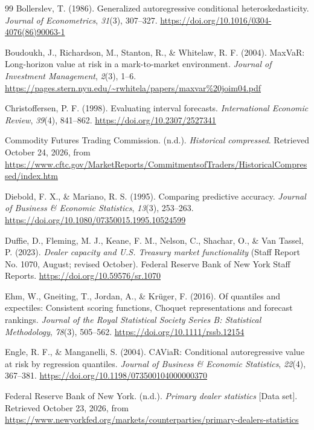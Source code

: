 \documentclass[11pt,a4paper]{article}
\begin{document}
\begin{thebibliography}{99}
 Bollerslev, T. (1986). Generalized autoregressive conditional heteroskedasticity. \emph{Journal of Econometrics}, \emph{31}(3), 307--327. \url{https://doi.org/10.1016/0304-4076(86)90063-1}

 Boudoukh, J., Richardson, M., Stanton, R., \& Whitelaw, R. F. (2004). MaxVaR: Long-horizon value at risk in a mark-to-market environment. \emph{Journal of Investment Management}, \emph{2}(3), 1--6. \url{https://pages.stern.nyu.edu/~rwhitela/papers/maxvar%20joim04.pdf}

 Christoffersen, P. F. (1998). Evaluating interval forecasts. \emph{International Economic Review}, \emph{39}(4), 841--862. \url{https://doi.org/10.2307/2527341}

 Commodity Futures Trading Commission. (n.d.). \emph{Historical compressed}. Retrieved October 24, 2026, from \url{https://www.cftc.gov/MarketReports/CommitmentsofTraders/HistoricalCompressed/index.htm}

 Diebold, F. X., \& Mariano, R. S. (1995). Comparing predictive accuracy. \emph{Journal of Business \& Economic Statistics}, \emph{13}(3), 253--263. \url{https://doi.org/10.1080/07350015.1995.10524599}

 Duffie, D., Fleming, M. J., Keane, F. M., Nelson, C., Shachar, O., \& Van Tassel, P. (2023). \emph{Dealer capacity and U.S. Treasury market functionality} (Staff Report No. 1070, August; revised October). Federal Reserve Bank of New York Staff Reports. \url{https://doi.org/10.59576/sr.1070}

 Ehm, W., Gneiting, T., Jordan, A., \& Krüger, F. (2016). Of quantiles and expectiles: Consistent scoring functions, Choquet representations and forecast rankings. \emph{Journal of the Royal Statistical Society Series B: Statistical Methodology}, \emph{78}(3), 505--562. \url{https://doi.org/10.1111/rssb.12154}

 Engle, R. F., \& Manganelli, S. (2004). CAViaR: Conditional autoregressive value at risk by regression quantiles. \emph{Journal of Business \& Economic Statistics}, \emph{22}(4), 367--381. \url{https://doi.org/10.1198/073500104000000370}

 Federal Reserve Bank of New York. (n.d.). \emph{Primary dealer statistics} [Data set]. Retrieved October 23, 2026, from \url{https://www.newyorkfed.org/markets/counterparties/primary-dealers-statistics}


\end{thebibliography}
\end{document}
